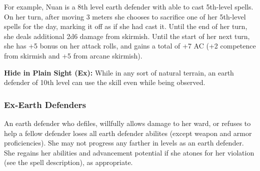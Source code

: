 {For example, Nuan is a 8th level earth defender with able to cast 5th-level spells. On her turn, after moving 3 meters she chooses to sacrifice one of her 5th-level spells for the day, marking it off as if she had cast it. Until the end of her turn, she deals additional 2d6 damage from skirmish. Until the start of her next turn, she has +5 bonus on her attack rolls, and gains a total of +7 AC (+2 competence from skirmish and +5 from arcane skirmish).

\textbf{Hide in Plain Sight (Ex):} While in any sort of natural terrain, an earth defender of 10th level can use the  skill even while being observed.

\subsubsection{Ex-Earth Defenders}
An earth defender who defiles, willfully allows damage to her ward, or refuses to help a fellow defender loses all earth defender abilites (except weapon and armor proficiencies). She may not progress any farther in levels as an earth defender. She regains her abilities and advancement potential if she atones for her violation (see the  spell description), as appropriate.
}

